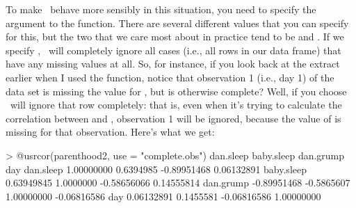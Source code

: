 To make \R\ behave more sensibly in this situation, you need to specify the  argument to the  function. There are several different values that you can specify for this, but the two that we care most about in practice tend to be  and . If we specify , \R\ will completely ignore all cases (i.e., all rows in our  data frame) that have any missing values at all. So, for instance, if you look back at the extract earlier when I used the  function, notice that observation 1 (i.e., day 1) of the  data set is missing the value for , but is otherwise complete? Well, if you choose  \R\ will ignore that row completely: that is, even when it's trying to calculate the correlation between  and , observation 1 will be ignored, because the value of  is missing for that observation. Here's what we get:
\begin{rblock1}
> @usr{cor(parenthood2, use = "complete.obs")}
             dan.sleep baby.sleep   dan.grump         day
dan.sleep   1.00000000  0.6394985 -0.89951468  0.06132891
baby.sleep  0.63949845  1.0000000 -0.58656066  0.14555814
dan.grump  -0.89951468 -0.5865607  1.00000000 -0.06816586
day         0.06132891  0.1455581 -0.06816586  1.00000000
\end{rblock1}



